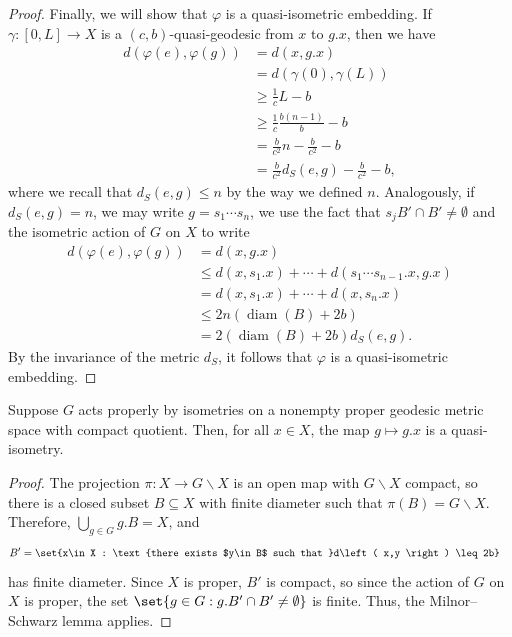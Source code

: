 \documentclass[10pt]{mypackage}
\begin{document}
\begin{proof}
  Finally, we will show that $\varphi$ is a quasi-isometric embedding. If $\gamma\colon [0,L]\to X$ is a $\left( c,b \right)$-quasi-geodesic from $x$ to $g.x$, then we have
  \begin{align*}
    d\left( \varphi(e),\varphi(g) \right) &= d\left( x,g.x \right)\\
                                          &= d\left( \gamma(0),\gamma(L) \right)\\
                                          &\geq \frac{1}{c}L - b\\
                                          &\geq \frac{1}{c}\frac{b\left( n-1 \right)}{b} - b\\
                                          &= \frac{b}{c^2}n - \frac{b}{c^2}-b\\
                                          &= \frac{b}{c^2}d_S\left( e,g \right) - \frac{b}{c^2} - b,
  \end{align*}
  where we recall that $d_S\left( e,g \right)\leq n$ by the way we defined $n$. Analogously, if $d_S\left( e,g \right) = n$, we may write $g = s_1\cdots s_n$, we use the fact that $s_jB'\cap B'\neq \emptyset$ and the isometric action of $G$ on $X$ to write
  \begin{align*}
    d\left( \varphi(e),\varphi(g) \right) &= d\left( x,g.x \right)\\
                                          &\leq d\left( x,s_1.x \right) + \cdots + d\left( s_1\cdots s_{n-1}.x,g.x \right)\\
                                          &= d\left( x,s_1.x \right) + \cdots + d\left( x,s_n.x \right)\\
                                          &\leq 2n\left( \operatorname{diam}\left( B \right) + 2b \right)\\
                                          &= 2\left( \operatorname{diam}\left( B \right) + 2b \right)d_S\left( e,g \right).
  \end{align*}
  By the invariance of the metric $d_S$, it follows that $\varphi$ is a quasi-isometric embedding.
\end{proof}
\begin{corollary}
  Suppose $G$ acts properly by isometries on a nonempty proper geodesic metric space with compact quotient. Then, for all $x\in X$, the map $g\mapsto g.x$ is a quasi-isometry.
\end{corollary}
\begin{proof}
  The projection $\pi\colon X\to G\backslash X$ is an open map with $G\backslash X$ compact, so there is a closed subset $B\subseteq X$ with finite diameter such that $\pi(B) = G\backslash X$. Therefore, $\bigcup_{g\in G}g.B = X$, and 
  \begin{align*}
    B' &= \set{x\in X : \text{there exists $y\in B$ such that }d\left( x,y \right) \leq 2b}
  \end{align*}
  has finite diameter. Since $X$ is proper, $B'$ is compact, so since the action of $G$ on $X$ is proper, the set $\set{g\in G : g.B'\cap B' \neq \emptyset}$ is finite. Thus, the Milnor--Schwarz lemma applies.
\end{proof}
\end{document}
